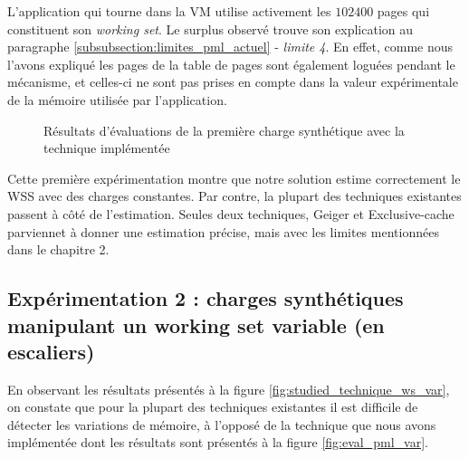 \noindent L'application qui tourne dans la VM utilise activement les $102400$ pages qui constituent son \emph{working set}. Le surplus observé trouve son explication au paragraphe \ref{subsubsection:limites_pml_actuel} - \textit{limite 4}. En effet, comme nous l'avons expliqué les pages de la table de pages sont également loguées pendant le mécanisme, et celles-ci ne sont pas prises en compte dans la valeur expérimentale de la mémoire utilisée par l'application.

\begin{figure}[H]
  \centering  
  \scriptsize
\caption{Résultats d'évaluations de la première charge synthétique avec la technique implémentée}
\label{fig:eval_pml_cst}
\end{figure}

\noindent Cette première expérimentation montre que notre solution estime correctement le WSS avec des charges constantes. Par contre, la plupart des techniques existantes passent à côté de l'estimation. Seules deux techniques, Geiger et Exclusive-cache parviennet à donner une estimation précise, mais avec les limites mentionnées dans le chapitre 2.

\subsection{Expérimentation 2 : charges synthétiques manipulant un working set variable (en escaliers)}
En observant les résultats présentés à la figure \ref{fig:studied_technique_ws_var}, on constate que pour la plupart des techniques existantes il est difficile de détecter les variations de mémoire, à l'opposé de la technique que nous avons implémentée dont les résultats sont présentés à la figure \ref{fig:eval_pml_var}.\\
\par


